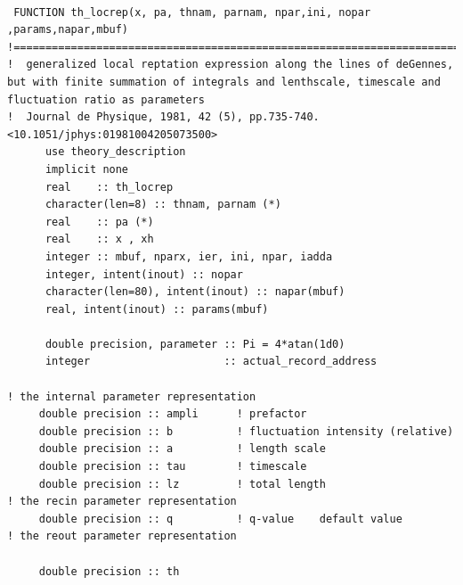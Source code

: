 \documentclass[11pt,fleqn]{book} %
\begin{document}
\tiny
\begin{verbatim}

 FUNCTION th_locrep(x, pa, thnam, parnam, npar,ini, nopar ,params,napar,mbuf)
!================================================================================
!  generalized local reptation expression along the lines of deGennes, but with finite summation of integrals and lenthscale, timescale and fluctuation ratio as parameters
!  Journal de Physique, 1981, 42 (5), pp.735-740. <10.1051/jphys:01981004205073500>
      use theory_description 
      implicit none 
      real    :: th_locrep
      character(len=8) :: thnam, parnam (*) 
      real    :: pa (*) 
      real    :: x , xh
      integer :: mbuf, nparx, ier, ini, npar, iadda
      integer, intent(inout) :: nopar       
      character(len=80), intent(inout) :: napar(mbuf) 
      real, intent(inout) :: params(mbuf) 
     
      double precision, parameter :: Pi = 4*atan(1d0)
      integer                     :: actual_record_address
     
! the internal parameter representation 
     double precision :: ampli      ! prefactor                                                                       
     double precision :: b          ! fluctuation intensity (relative)                                                
     double precision :: a          ! length scale                                                                    
     double precision :: tau        ! timescale                                                                       
     double precision :: lz         ! total length                                                                    
! the recin parameter representation 
     double precision :: q          ! q-value    default value                                                        
! the reout parameter representation 
 
     double precision :: th
 

\end{verbatim}
\end{document}
